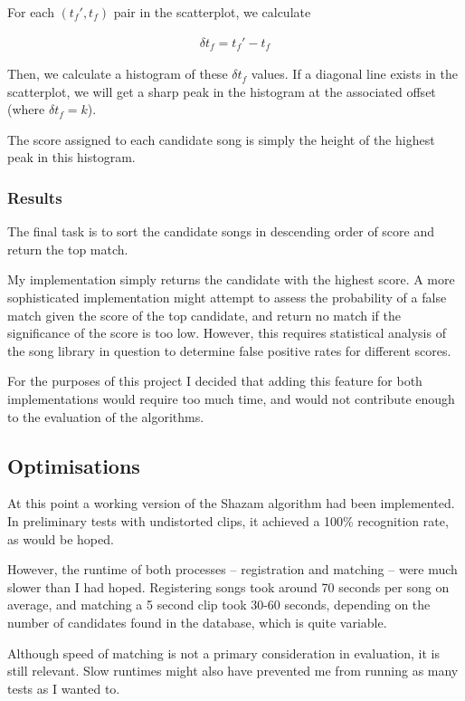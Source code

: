 \documentclass[12pt,a4paper,twoside,openright]{report}
\begin{document}
For each $(t_f',t_f)$ pair in the scatterplot, we calculate

\begin{align*}
  \delta t_f = t_f' - t_f
\end{align*}

Then, we calculate a histogram of these $\delta t_f$ values. If a diagonal line exists in the scatterplot, we will get a sharp peak in the histogram at the associated offset (where $\delta t_f = k$).

The score assigned to each candidate song is simply the height of the highest peak in this histogram.


\subsubsection{Results}

The final task is to sort the candidate songs in descending order of score and return the top match. 

My implementation simply returns the candidate with the highest score. A more sophisticated implementation might attempt to assess the probability of a false match given the score of the top candidate, and return no match if the significance of the score is too low. However, this requires statistical analysis of the song library in question to determine false positive rates for different scores.

For the purposes of this project I decided that adding this feature for both implementations would require too much time, and would not contribute enough to the evaluation of the algorithms.


\subsection{Optimisations}
\label{section:shazamoptimisations}

At this point a working version of the Shazam algorithm had been implemented. In preliminary tests with undistorted clips, it achieved a 100\% recognition rate, as would be hoped.

However, the runtime of both processes -- registration and matching -- were much slower than I had hoped. Registering songs took around 70 seconds per song on average, and matching a 5 second clip took 30-60 seconds, depending on the number of candidates found in the database, which is quite variable.

Although speed of matching is not a primary consideration in evaluation, it is still relevant. Slow runtimes might also have prevented me from running as many tests as I wanted to. 
\end{document}
